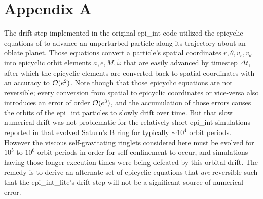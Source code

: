 \documentclass[preprint]{aastex62}
\begin{document}
\section{Appendix A}
\label{sec:Appendix A}

The drift step implemented in the original epi\_int code utilized the epicyclic equations of \cite{BL94}
to advance an unperturbed particle along its trajectory about an oblate planet. Those equations
convert a particle's spatial coordinates $r, \theta, v_r, v_\theta$
into epicyclic orbit elements $a,e,M,\tilde{\omega}$ that are easily advanced by timestep
$\Delta t$, after which the epicyclic elements are converted back to spatial coordinates
with an accuracy to ${\cal O}(e^2)$. Note though that those epicyclic equations are not reversible;
every conversion from spatial to epicyclic coordinates or vice-versa also introduces an 
error of order ${\cal O}(e^3)$, and the accumulation of those errors causes the orbits of the epi\_int particles to 
slowly drift over time.  But that slow numerical drift
was not problematic for the relatively short epi\_int simulations reported in \cite{HS13} that evolved
Saturn's B ring for typically $\sim10^4$ orbit periods. However the viscous self-gravitating
ringlets considered here must be evolved for $10^5$ to $10^6$ orbit periods in order for self-confinement to occur,
and simulations having those longer execution times were being defeated by this orbital drift. 
The remedy is to derive an alternate set of epicyclic equations that
{\em are} reversible such that the epi\_int\_lite's drift step will not be a significant
source of numerical error.
\end{document}

